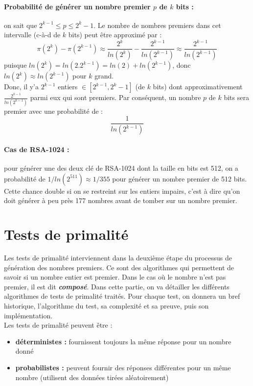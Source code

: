 		\paragraph{Probabilité de générer un nombre premier $p$ de $k$ bits :} on sait que $2^{k-1} \leqslant p \leqslant 2^{k}-1$. Le nombre de nombres premiers dans cet intervalle (c-à-d de $k$ bits) peut être approximé par :
		\[ \pi(2^{k}) - \pi(2^{k-1}) \approx \frac{2^{k}}{ln(2^{k})} - \frac{2^{k-1}}{ln(2^{k-1})} \approx \frac{2^{k-1}}{ln(2^{k-1})}	\]
		puisque $ln(2^{k}) = ln(2.2^{k-1}) = ln(2) + ln(2^{k-1})$, donc $ln(2^{k}) \approx ln(2^{k-1})$ pour $k$ grand.
		\vspace{1em}
		\\
		\noindent Donc, il y'a $2^{k-1}$ entiers $\in [2^{k-1},2^{k}-1]$ (de $k$ bits) dont approximativement $\frac{2^{k-1}}{ln(2^{k-1})}$ parmi eux qui sont premiers. Par conséquent, un nombre $p$ de $k$ bits sera premier avec une probabilité de :
		\[\frac{1}{ln(2^{k-1})}\]
		
		\paragraph{Cas de RSA-1024 :} pour générer une des deux clé de RSA-1024 dont la taille en bits est 512, on a probabilité de $1/ln(2^{511}) \approx 1/355$ pour générer un nombre premier de 512 bits. Cette chance double si on se restreint sur les entiers impairs, c'est à dire qu'on doit générer à peu près 177 nombres avant de tomber sur un nombre premier.
		
	
	\section{Tests de primalité}
		Les tests de primalité interviennent dans la deuxième étape du processus de génération des nombres premiers. Ce sont des algorithmes qui permettent de savoir si un nombre entier est premier. Dans le cas où le nombre n'est pas premier, il est dit \textbf{\textit{composé}}. Dans cette partie, on va détailler les différents algorithmes de tests de primalité traités. Pour chaque test, on donnera un bref historique, l'algorithme du test, sa complexité et sa preuve, puis son implémentation.\\
		Les tests de primalité peuvent être :
		\begin{itemize}[leftmargin=*]
			\item \textbf{déterministes :} fournissent toujours la même réponse pour un nombre donné
			\item \textbf{probabilistes :} peuvent fournir des réponses différentes pour un même nombre (utilisent des données tirées aléatoirement)
		\end{itemize}
		
